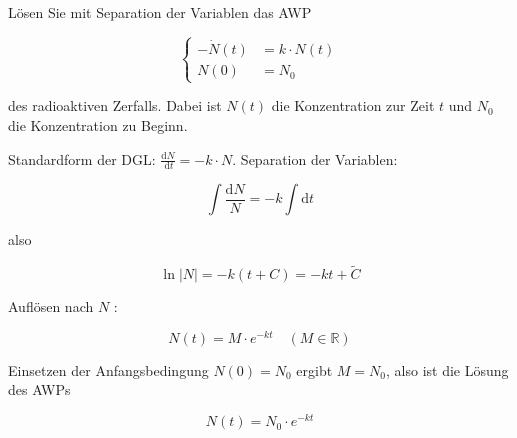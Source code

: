 \begin{example}
    Lösen Sie mit Separation der Variablen das AWP

    $$
    \left\{\begin{aligned}
    -\dot{N}(t) & =k \cdot N(t) \\
    N(0) & =N_{0}
    \end{aligned}\right.
    $$
    
    des radioaktiven Zerfalls. Dabei ist $N(t)$ die Konzentration zur Zeit $t$ und $N_{0}$ die Konzentration zu Beginn.

\tcblower
Standardform der DGL: $\frac{\mathrm{d} N}{\mathrm{~d} t}=-k \cdot N$. Separation der Variablen:

$$
\int \frac{\mathrm{d} N}{N}=-k \int \mathrm{d} t
$$

also

$$
\ln |N|=-k(t+C)=-k t+\tilde{C}
$$

Auflösen nach $N$ :

$$
N(t)=M \cdot e^{-k t} \quad(M \in \mathbb{R})
$$

Einsetzen der Anfangsbedingung $N(0)=N_{0}$ ergibt $M=N_{0}$, also ist die Lösung des AWPs

$$
N(t)=N_{0} \cdot e^{-k t}
$$
\end{example}





